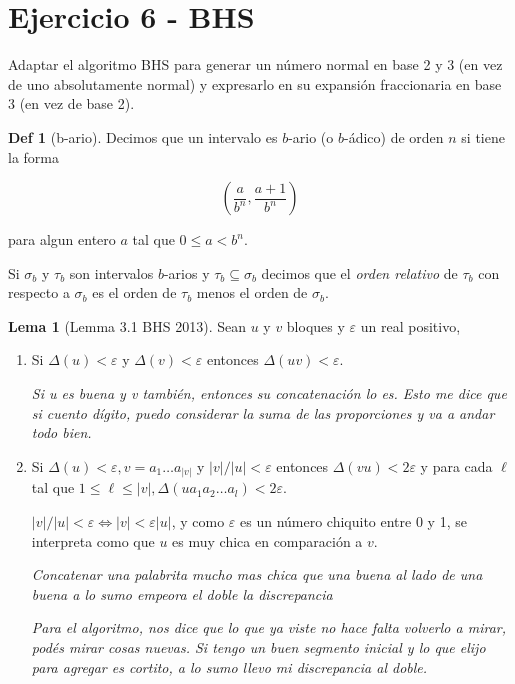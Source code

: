 \documentclass{article}
\theoremstyle{definition} %
\newtheorem{lemma}{Lema}
\newtheorem*{definition*}{Def}
\begin{document}
\section*{Ejercicio 6 - BHS}

Adaptar el algoritmo BHS para generar un número normal en base 2 y 3 (en vez de
uno absolutamente normal) y expresarlo en su expansión fraccionaria en base 3
(en vez de base 2).

\begin{definition*}[b-ario]
    Decimos que un intervalo es $b$-ario (o $b$-ádico) de orden $n$ si tiene la
    forma

    \[
        \left(\frac{a}{b^n}, \frac{a+1}{b^n}\right)
    \]

    para algun entero $a$ tal que $0 \leq a < b^n$.

    Si $\sigma_b$ y $\tau_b$ son intervalos $b$-arios y $\tau_b \subseteq
    \sigma_b$ decimos que el \textit{orden relativo} de $\tau_b$ con respecto a
    $\sigma_b$ es el orden de $\tau_b$ menos el orden de $\sigma_b$.
\end{definition*}

\begin{lemma}[Lemma 3.1 BHS 2013]\label{lemma:bhs-concat-good}
    Sean $u$ y $v$ bloques y $\varepsilon$ un real positivo,

    \begin{enumerate}
        \item Si $\Delta(u) < \varepsilon$ y $\Delta(v) < \varepsilon$ entonces
        $\Delta(uv) < \varepsilon$.

        \textit{Si u es buena y v también, entonces su concatenación lo es.
        Esto me dice que si cuento dígito, puedo considerar la suma de las
        proporciones y va a andar todo bien.}

        \item Si $\Delta(u) < \varepsilon, v = a_1 \dots a_{|v|}$ y $|v|/|u| <
        \varepsilon$ entonces $\Delta(vu) < 2\varepsilon$ y para cada $\ell$ tal
        que $1 \leq \ell \leq |v|, \Delta(ua_1a_2\dots a_l) < 2\varepsilon$.

        $|v|/|u| < \varepsilon \Leftrightarrow |v| < \varepsilon|u|$, y como
        $\varepsilon$ es un número chiquito entre 0 y 1, se interpreta como que
        $u$ es muy chica en comparación a $v$.

        \textit{Concatenar una palabrita mucho mas chica que una buena al lado
        de una buena a lo sumo empeora el doble la discrepancia}

        \textit{Para el algoritmo, nos dice que lo que ya viste no hace falta
        volverlo a mirar, podés mirar cosas nuevas. Si tengo un buen segmento
        inicial y lo que elijo para agregar es cortito, a lo sumo llevo mi
        discrepancia al doble.}
    \end{enumerate}
\end{lemma}
\end{document}

